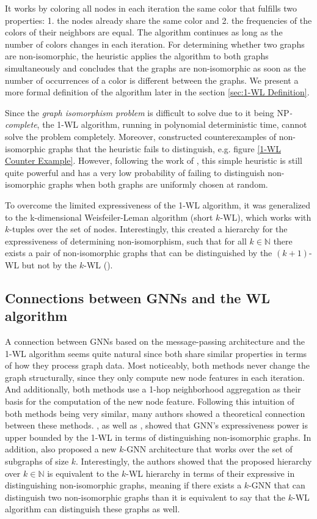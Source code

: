 \documentclass[11pt, dvipsnames, DIV=12]{scrreprt}
\theoremstyle{definition}
\begin{document}
It works by coloring all nodes in each iteration the same color that fulfills two properties: 1. the nodes already share the same color and 2. the frequencies of the colors of their neighbors are equal. The algorithm continues as long as the number of colors changes in each iteration.
For determining whether two graphs are non-isomorphic, the heuristic applies the algorithm to both graphs simultaneously and concludes that the graphs are non-isomorphic as soon as the number of occurrences of a color is different between the graphs. We present a more formal definition of the algorithm later in the section \ref{sec:1-WL Definition}.

Since the \textit{graph isomorphism problem} is difficult to solve due to it being \textsf{NP}\textit{-complete}, the 1-WL algorithm, running in polynomial deterministic time, cannot solve the problem completely. Moreover, \cite{Cai1992} constructed counterexamples of non-isomorphic graphs that the heuristic fails to distinguish, e.g. figure \ref{1-WL Counter Example}. However, following the work of \cite{Bab+1979}, this simple heuristic is still quite powerful and has a very low probability of failing to distinguish non-isomorphic graphs when both graphs are uniformly chosen at random.

To overcome the limited expressiveness of the 1-WL algorithm, it was generalized to the k-dimensional Weisfeiler-Leman algorithm (short $k$-WL), which works with $k$-tuples over the set of nodes. Interestingly, this created a hierarchy for the expressiveness of determining non-isomorphism, such that for all $k \in \mathbb{N}$ there exists a pair of non-isomorphic graphs that can be distinguished by the $(k+1)$-WL but not by the $k$-WL (\cite{Cai1992}).

\subsection{Connections between GNNs and the WL algorithm}\label{sec:conn gnn and 1wl}
A connection between GNNs based on the message-passing architecture and the 1-WL algorithm seems quite natural since both share similar properties in terms of how they process graph data. Most noticeably, both methods never change the graph structurally, since they only compute new node features in each iteration. And additionally, both methods use a 1-hop neighborhood aggregation as their basis for the computation of the new node feature. Following this intuition of both methods being very similar, many authors showed a theoretical connection between these methods. \cite{Morris2018}, as well as \cite{Xu2018}, showed that GNN's expressiveness power is upper bounded by the 1-WL in terms of distinguishing non-isomorphic graphs. In addition, \cite{Morris2018} also proposed a new $k$-GNN architecture that works over the set of subgraphs of size $k$. Interestingly, the authors showed that the proposed hierarchy over $k \in \mathbb{N}$ is equivalent to the $k$-WL hierarchy in terms of their expressive in distinguishing non-isomorphic graphs, meaning if there exists a $k$-GNN that can distinguish two non-isomorphic graphs than it is equivalent to say that the $k$-WL algorithm can distinguish these graphs as well.
\end{document}
